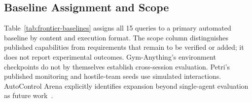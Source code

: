 \documentclass{article} %
\begin{document}
	\endgroup
	
	\subsection{Baseline Assignment and Scope}\label{app:baseline-scope}
	
	Table~\ref{tab:frontier-baselines} assigns all 15 queries to a primary automated
	baseline by content and execution format. The scope column distinguishes
	published capabilities from requirements that remain to be verified or added;
	it does not report experimental outcomes. Gym-Anything's environment checkpoints
	do not by themselves establish cross-session evaluation. Petri's published
	monitoring and hostile-team seeds use simulated interactions. AutoControl
	Arena explicitly identifies expansion beyond single-agent evaluation as future
	work~\citep{aggarwal2026gymanything,fronsdal2025petri,li2026autocontrol}.
	
\end{document}
